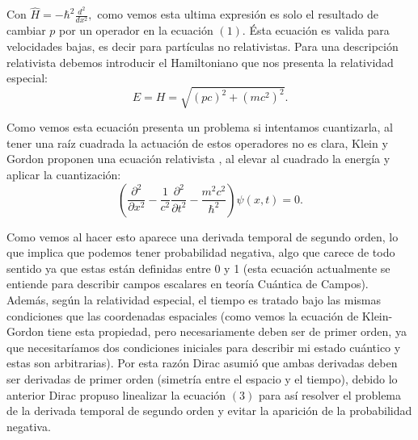 \documentclass[twocolumn]{article}
\begin{document}
Con $\hat{H}= -\hbar^2 \frac{d^2}{dx^2} ,$  como vemos esta ultima expresión es solo el resultado de cambiar $p$ por un operador en la ecuación $(1)$. Ésta ecuación es valida para velocidades bajas, es decir para partículas no relativistas. Para una descripción relativista debemos introducir el Hamiltoniano que nos presenta la relatividad especial:
\begin{equation}
   E=H=\sqrt{(pc)^2 + (mc^2)^2} .
\end{equation}

Como vemos esta ecuación presenta un problema si intentamos cuantizarla, al tener una raíz cuadrada la actuación de estos operadores no es clara, Klein y Gordon proponen una ecuación relativista , al  elevar al cuadrado la energía y aplicar la cuantización:
\begin{equation}
   \left(\frac{\partial^2}{\partial x^2}- \frac{1}{c^2}\frac{\partial^2}{\partial t^2}-\frac{m^2 c^2}{\hbar ^2}\right)\psi(x,t)=0 .
\end{equation}

Como vemos al hacer esto aparece una derivada temporal de segundo orden, lo que implica que podemos tener probabilidad negativa, algo que carece de todo sentido ya que estas están definidas entre 0 y 1 (esta ecuación actualmente se entiende para describir campos escalares en teoría Cuántica de Campos). Además, según la relatividad especial, el tiempo es tratado bajo las mismas condiciones que las coordenadas espaciales (como vemos la ecuación de Klein-Gordon tiene esta propiedad, pero necesariamente deben ser de primer orden, ya que necesitaríamos dos condiciones iniciales para describir mi estado cuántico y estas son arbitrarias). Por esta razón Dirac asumió que ambas derivadas deben ser derivadas de primer orden (simetría entre el espacio y el tiempo), debido lo anterior Dirac propuso linealizar la ecuación $(3)$ para así resolver el problema de la derivada temporal de segundo orden y evitar la aparición de la probabilidad negativa.
\end{document}
